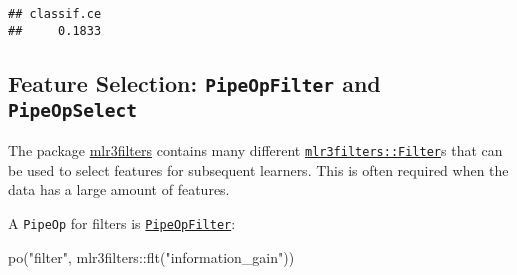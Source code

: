 \documentclass[
]{scrbook}
\newenvironment{Shaded}{\begin{snugshade}}{\end{snugshade}}
\newcommand{\DecValTok}[1]{\textcolor[rgb]{0.00,0.00,0.81}{#1}}
\newcommand{\FunctionTok}[1]{\textcolor[rgb]{0.00,0.00,0.00}{#1}}
\newcommand{\NormalTok}[1]{#1}
\newcommand{\OtherTok}[1]{\textcolor[rgb]{0.56,0.35,0.01}{#1}}
\newcommand{\SpecialCharTok}[1]{\textcolor[rgb]{0.00,0.00,0.00}{#1}}
\newcommand{\StringTok}[1]{\textcolor[rgb]{0.31,0.60,0.02}{#1}}
\renewenvironment{Shaded} {\begin{snugshade}\small} {\end{snugshade}}
\begin{document}
\begin{Shaded}
\end{Shaded}

\begin{verbatim}
## classif.ce 
##     0.1833
\end{verbatim}

\hypertarget{feature-selection-pipeopfilter-and-pipeopselect}{%
\subsection{\texorpdfstring{Feature Selection: \texttt{PipeOpFilter} and \texttt{PipeOpSelect}}{Feature Selection: PipeOpFilter and PipeOpSelect}}\label{feature-selection-pipeopfilter-and-pipeopselect}}

The package \href{https://mlr3filters.mlr-org.com}{mlr3filters} contains many different \href{https://mlr3filters.mlr-org.com/reference/Filter.html}{\texttt{mlr3filters::Filter}}s that can be used to select features for subsequent learners.
This is often required when the data has a large amount of features.

A \texttt{PipeOp} for filters is \href{https://mlr3pipelines.mlr-org.com/reference/mlr_pipeops_filter.html}{\texttt{PipeOpFilter}}:

\begin{Shaded}
\begin{Highlighting}[]
\FunctionTok{po}\NormalTok{(}\StringTok{"filter"}\NormalTok{, mlr3filters}\SpecialCharTok{::}\FunctionTok{flt}\NormalTok{(}\StringTok{"information\_gain"}\NormalTok{))}
\end{Highlighting}
\end{Shaded}
\end{document}
